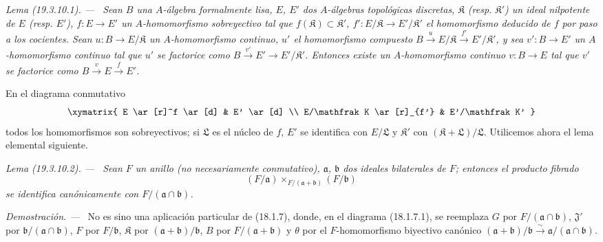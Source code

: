 \documentclass[10pt,oneside]{book}
\makeatletter
\newcommand{\setmanualcurrentlabel}[1]{\def\@currentlabel{#1}}
\newcommand{\oldpage}[2][]{%
  \setcounter{footnote}{0}%
  \marginpar{\scriptsize\textbf{#1}~|~#2}\ignorespaces}
\newenvironment{lemma}[1][]{%
  \setmanualcurrentlabel{#1}\par\medskip\noindent\itshape Lema (#1). ---\ }{\par}
\newenvironment{proof}{%
  \par\medskip\noindent\textit{Demostración. ---\ }}{\par}
\makeatother
\begin{document}
\begin{lemma}[19.3.10.1]
\label{0.19.3.10.1-es}
Sean $B$ una $A$-álgebra formalmente lisa, $E$, $E'$ dos $A$-álgebras
topológicas discretas, $\mathfrak K$ \textup{(resp. $\mathfrak K'$)} un ideal
nilpotente de $E$ \textup{(resp. $E'$)}, $f:E\to E'$ un $A$-homomorfismo sobreyectivo tal
que $f(\mathfrak K)\subset\mathfrak K'$, $f':E/\mathfrak K\to
E'/\mathfrak K'$ el homomorfismo deducido de $f$ por paso a los cocientes.
Sean $u:B\to E/\mathfrak K$ un $A$-homomorfismo continuo, $u'$ el
homomorfismo compuesto
$B\xrightarrow{u}E/\mathfrak K\xrightarrow{f'}E'/\mathfrak K'$, y sea
$v':B\to E'$ un $A$-homomorfismo continuo tal que $u'$ se factorice como
$B\xrightarrow{v'}E'\to E'/\mathfrak K'$. Entonces existe un
$A$-homomorfismo continuo $v:B\to E$ tal que $v'$ se factorice como
$B\xrightarrow{v}E\xrightarrow{f}E'$.
\end{lemma}

En el diagrama conmutativo
\[
\xymatrix{
  E \ar[r]^f \ar[d] & E' \ar[d] \\
  E/\mathfrak K \ar[r]_{f'} & E'/\mathfrak K'
}
\]
todos los homomorfismos son sobreyectivos; si $\mathfrak L$ es el núcleo de
$f$, $E'$ se identifica con $E/\mathfrak L$ y $\mathfrak K'$ con
$(\mathfrak K+\mathfrak L)/\mathfrak L$. Utilicemos ahora el lema
elemental siguiente.

\begin{lemma}[19.3.10.2]
\label{0.19.3.10.2-es}
Sean $F$ un anillo (no necesariamente conmutativo), $\mathfrak a$,
$\mathfrak b$ dos ideales bilaterales de $F$; entonces el producto fibrado
\[
  (F/\mathfrak a)\times_{F/(\mathfrak a+\mathfrak b)}(F/\mathfrak b)
\]
se identifica canónicamente con $F/(\mathfrak a\cap\mathfrak b)$.
\end{lemma}

\begin{proof}
No es sino una aplicación particular de (18.1.7), donde, en el
diagrama (18.1.7.1), se reemplaza $G$ por
$F/(\mathfrak a\cap\mathfrak b)$, $\mathfrak J'$ por
$\mathfrak b/(\mathfrak a\cap\mathfrak b)$, $F$ por
$F/\mathfrak b$, $\mathfrak K$ por
$(\mathfrak a+\mathfrak b)/\mathfrak b$, $B$ por
$F/(\mathfrak a+\mathfrak b)$ y $\theta$ por el $F$-homomorfismo
biyectivo canónico
$(\mathfrak a+\mathfrak b)/\mathfrak b\xrightarrow{\sim}
\mathfrak a/(\mathfrak a\cap\mathfrak b)$.
\end{proof}

\oldpage[0\textsubscript{IV-1}]{85}
\end{document}
